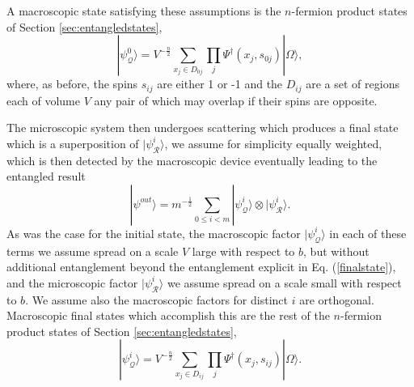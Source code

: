 \documentclass[12pt,amsmath,amssymb,onecolumn]{revtex4-2}
\begin{document}
A  macroscopic state satisfying these assumptions is 
the $n$-fermion product states of Section \ref{sec:entangledstates},
\begin{equation}
\label{macroproductstate}
|\psi^0_{\mathcal{Q}} \rangle  = V^{-\frac{n}{2}}\sum_{x_j \in D_{0j}} \prod_j \Psi^{\dagger}(x_j, s_{0j}) |\Omega \rangle ,
\end{equation}
where, as before, the spins $s_{ij}$ are either 1 or -1 and the $D_{ij}$ are a set of regions 
each of volume $V$ any pair of which may overlap if their spins are opposite.

The microscopic system then undergoes scattering which produces
a final state which is a superposition of $|\psi^i_{\mathcal{R}} \rangle $, we assume for simplicity
equally weighted, which is then detected by
the macroscopic device eventually leading to the entangled result
\begin{equation}
\label{finalstate}
|\psi^{out} \rangle  = m^{-\frac{1}{2}} \sum_{0 \le i < m} |\psi^i_{\mathcal{Q}} \rangle  \otimes |\psi^i_{\mathcal{R}} \rangle .
\end{equation}
As was the case for the initial state, the macroscopic factor $|\psi^i_{\mathcal{Q}} \rangle $ in each
of these terms we assume spread on a scale $V$ large with respect to $b$, but without
additional entanglement beyond the entanglement explicit in Eq. (\ref{finalstate}),
and the microscopic factor $|\psi^i_{\mathcal{R}} \rangle $ we assume 
spread on a scale small with respect to $b$.
We assume also the macroscopic factors for distinct $i$ are orthogonal. 
Macroscopic final states which accomplish this 
are the rest of the $n$-fermion product states of
Section \ref{sec:entangledstates},
\begin{equation}
\label{macroproductstate1}
|\psi^i_{\mathcal{Q}} \rangle  = V^{-\frac{n}{2}}\sum_{x_j \in D_{ij}} \prod_j \Psi^{\dagger}(x_j, s_{ij}) |\Omega \rangle .
\end{equation}
\end{document}
